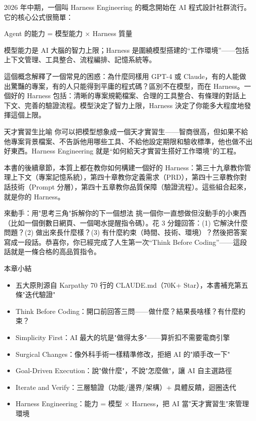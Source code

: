 
2026 年中期，一個叫 Harness Engineering 的概念開始在 AI 程式設計社群流行。它的核心公式很簡單：

Agent 的能力 = 模型能力 × Harness 質量

模型能力是 AI 大腦的智力上限；Harness 是圍繞模型搭建的“工作環境”——包括上下文管理、工具整合、流程編排、記憶系統等。

這個概念解釋了一個常見的困惑：為什麼同樣用 GPT-4 或 Claude，有的人能做出驚豔的專案，有的人只能得到平庸的程式碼？區別不在模型，而在 Harness。一個好的 Harness 包括：清晰的專案規範檔案、合理的工具整合、有條理的對話上下文、完善的驗證流程。模型決定了智力上限，Harness 決定了你能多大程度地發揮這個上限。

\begin{tcbinfo}{天才實習生比喻}
你可以把模型想象成一個天才實習生——智商很高，但如果不給他專案背景檔案、不告訴他用哪些工具、不給他設定期限和驗收標準，他也做不出好東西。Harness Engineering 就是“如何給天才實習生搭好工作環境”的工程。

\end{tcbinfo}

本書的後續章節，本質上都在教你如何構建一個好的 Harness：第三十九章教你管理上下文（專案記憶系統），第四十章教你定義需求（PRD），第四十三章教你對話技術（Prompt 分層），第四十五章教你品質保障（驗證流程）。這些組合起來，就是你的 Harness。

\begin{tcbpractice}{來動手：用"思考三角"拆解你的下一個想法}
挑一個你一直想做但沒動手的小東西（比如一個倒數日網頁、一個喝水提醒指令碼）。花 3 分鐘回答：(1) 它解決什麼問題？(2) 做出來長什麼樣？(3) 有什麼約束（時間、技術、環境）？然後把答案寫成一段話。恭喜你，你已經完成了人生第一次“Think Before Coding”——這段話就是一條合格的高品質指令。

\end{tcbpractice}

\begin{tcbsummary}{本章小結}
\begin{itemize}
  \item 五大原則源自 Karpathy 70 行的 CLAUDE.md（70K+ Star），本書補充第五條"迭代驗證"
  \item Think Before Coding：開口前回答三問——做什麼？結果長啥樣？有什麼約束？
  \item Simplicity First：AI 最大的坑是"做得太多"——算折扣不需要電商引擎
  \item Surgical Changes：像外科手術一樣精準修改，拒絕 AI 的"順手改一下"
  \item Goal-Driven Execution：說"做什麼"，不說"怎麼做"，讓 AI 自主選路徑
  \item Iterate and Verify：三層驗證（功能/邊界/架構）+ 具體反饋，迴圈迭代
  \item Harness Engineering：能力 = 模型 × Harness，把 AI 當"天才實習生"來管理環境
\end{itemize}

\end{tcbsummary}
